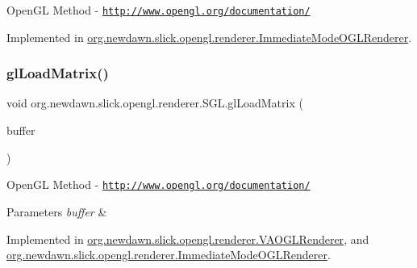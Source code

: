 Open\+GL Method -\/  \href{http://www.opengl.org/documentation/}{\tt http\+://www.\+opengl.\+org/documentation/} 

Implemented in \mbox{\hyperlink{classorg_1_1newdawn_1_1slick_1_1opengl_1_1renderer_1_1_immediate_mode_o_g_l_renderer_a64a4b2b9f62fd02752de26da5e9b4b99}{org.\+newdawn.\+slick.\+opengl.\+renderer.\+Immediate\+Mode\+O\+G\+L\+Renderer}}.

\mbox{\label{interfaceorg_1_1newdawn_1_1slick_1_1opengl_1_1renderer_1_1_s_g_l_a41baff345ccbf53de61ebb3c77e02914}} 
\subsubsection{\texorpdfstring{gl\+Load\+Matrix()}{glLoadMatrix()}}
{\footnotesize\ttfamily void org.\+newdawn.\+slick.\+opengl.\+renderer.\+S\+G\+L.\+gl\+Load\+Matrix (\begin{DoxyParamCaption}\item[{Float\+Buffer}]{buffer }\end{DoxyParamCaption})}

Open\+GL Method -\/  \href{http://www.opengl.org/documentation/}{\tt http\+://www.\+opengl.\+org/documentation/}


\begin{DoxyParams}{Parameters}
{\em buffer} & \\
\hline
\end{DoxyParams}


Implemented in \mbox{\hyperlink{classorg_1_1newdawn_1_1slick_1_1opengl_1_1renderer_1_1_v_a_o_g_l_renderer_ac5401989bccd77b9d35db9b998d5fa4c}{org.\+newdawn.\+slick.\+opengl.\+renderer.\+V\+A\+O\+G\+L\+Renderer}}, and \mbox{\hyperlink{classorg_1_1newdawn_1_1slick_1_1opengl_1_1renderer_1_1_immediate_mode_o_g_l_renderer_a582d55ee56e4f27c61484c155406755c}{org.\+newdawn.\+slick.\+opengl.\+renderer.\+Immediate\+Mode\+O\+G\+L\+Renderer}}.

\mbox{\label{interfaceorg_1_1newdawn_1_1slick_1_1opengl_1_1renderer_1_1_s_g_l_a85746cd7e0de9297a821619097a5f7cc}} 

